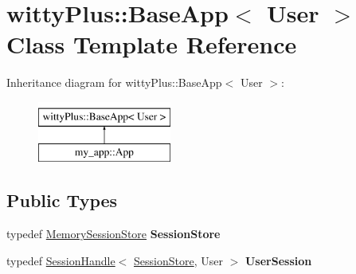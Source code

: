 \hypertarget{classwittyPlus_1_1BaseApp}{
\section{wittyPlus::BaseApp$<$ User $>$ Class Template Reference}
\label{classwittyPlus_1_1BaseApp}
}
Inheritance diagram for wittyPlus::BaseApp$<$ User $>$:\begin{figure}[H]
\begin{center}
\leavevmode
\includegraphics[height=2.000000cm]{classwittyPlus_1_1BaseApp}
\end{center}
\end{figure}
\subsection*{Public Types}
\begin{DoxyCompactItemize}
\item 
\hypertarget{classwittyPlus_1_1BaseApp_a9191d151a9f85dfaaf41300db9c97b40}{
typedef \hyperlink{classwittyPlus_1_1MemorySessionStore}{MemorySessionStore} {\bfseries SessionStore}}
\label{classwittyPlus_1_1BaseApp_a9191d151a9f85dfaaf41300db9c97b40}

\item 
\hypertarget{classwittyPlus_1_1BaseApp_a765536d2659f45625d60897d9fed3e89}{
typedef \hyperlink{classwittyPlus_1_1SessionHandle}{SessionHandle}$<$ \hyperlink{classwittyPlus_1_1MemorySessionStore}{SessionStore}, User $>$ {\bfseries UserSession}}
\label{classwittyPlus_1_1BaseApp_a765536d2659f45625d60897d9fed3e89}

\end{DoxyCompactItemize}
